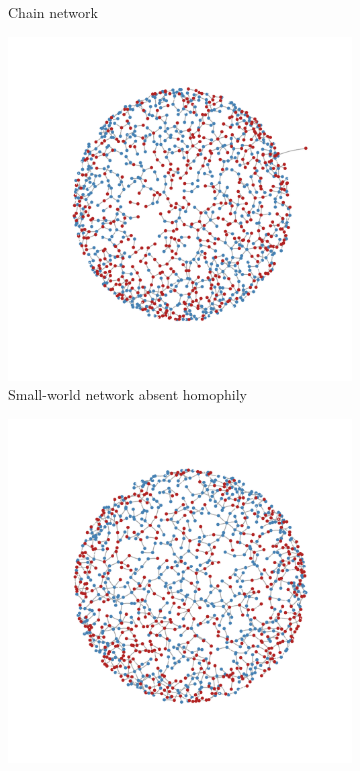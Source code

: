 \documentclass[man, 12pt, a4paper, nolmodern, noextraspace]{apa6}
\begin{document}
\begin{figure}
\begin{subfigure}[t]{0.45\textwidth}
        \caption{Chain network} \label{fig1:tree}
    \end{subfigure}

    \vspace{1cm}
    \begin{subfigure}[t]{0.45\textwidth}
        \centering
        \includegraphics[trim={2cm 2cm 2cm 2cm}, clip, width=\linewidth]{draft/network_plots3.pdf} 
        \caption{Small-world network absent homophily} \label{fig1:nohomophily}
    \end{subfigure}
    \hfill
    \begin{subfigure}[t]{0.45\textwidth}
        \centering
        \includegraphics[trim={2cm 2cm 2cm 2cm}, clip, width=\linewidth]{draft/network_plots4.pdf} 

\end{subfigure}
\end{figure}
\end{document}
